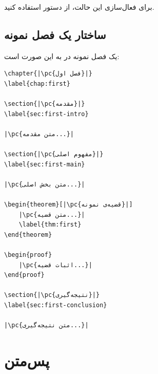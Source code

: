 برای فعال‌سازی این حالت، از دستور
 استفاده کنید.


\subsection{ساختار یک فصل نمونه}
\label{sec:book-structure-chapter-example}

یک فصل نمونه در  به این صورت است:

\begin{latin}
\begin{verbatim}
\chapter{|\pc{فصل اول}|}
\label{chap:first}

\section{|\pc{مقدمه}|}
\label{sec:first-intro}

|\pc{متن مقدمه...}|

\section{|\pc{مفهوم اصلی}|}
\label{sec:first-main}

|\pc{متن بخش اصلی...}|

\begin{theorem}[|\pc{قضیه‌ی نمونه}|]
    |\pc{متن قضیه...}|
    \label{thm:first}
\end{theorem}

\begin{proof}
    |\pc{اثبات قضیه...}|
\end{proof}

\section{|\pc{نتیجه‌گیری}|}
\label{sec:first-conclusion}

|\pc{متن نتیجه‌گیری...}|
\end{verbatim}
\end{latin}


\section{پس‌متن}
\label{sec:book-structure-backmatter}

